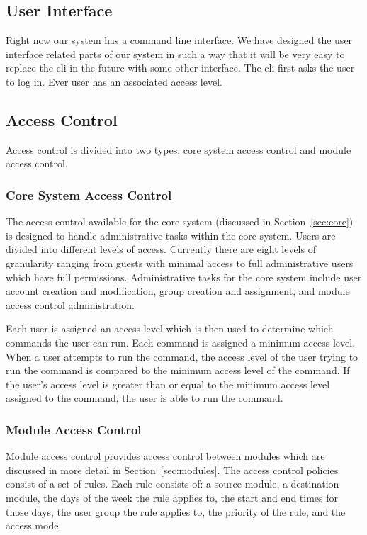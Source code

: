 \subsection{User Interface}
\label{sec:interface}
Right now our system has a command line interface. We have designed the user
interface related parts of our system in such a way that it will be very easy
to replace the cli in the future with some other interface. The cli first asks
the user to log in. Ever user has an associated access level. 
\subsection{Access Control}
\label{sec:access}
Access control is divided into two types: core system access control and module
access control.
\subsubsection{Core System Access Control}
The access control available for the core system (discussed in
Section~\ref{sec:core}) is designed to handle administrative tasks within the
core system. Users are divided into different levels of access. Currently there
are eight levels of granularity ranging from guests with minimal access to
full administrative users which have full permissions. Administrative tasks for
the core system include user account creation and modification, group creation
and assignment, and module access control administration.

Each user is assigned an access level which is then used to determine which
commands the user can run. Each command is assigned a minimum access level.
When a user attempts to run the command, the access level of the user trying to
run the command is compared to the minimum access level of the command. If the
user's access level is greater than or equal to the minimum access level
assigned to the command, the user is able to run the command.
\subsubsection{Module Access Control}
Module access control provides access control between modules which are
discussed in more detail in Section~\ref{sec:modules}. The access control
policies consist of a set of rules. Each rule consists of: a source module, a
destination module, the days of the week the rule applies to, the start and end
times for those days, the user group the rule applies to, the priority of the
rule, and the access mode.

